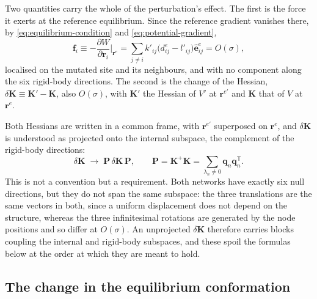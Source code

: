 \documentclass[11pt]{article}
\newcommand{\rr}{\mathbf{r}}
\newcommand{\ee}{\hat{\mathbf{e}}}
\newcommand{\KK}{\mathbf{K}}
\newcommand{\re}{\rr^{e}}
\newcommand{\rem}{\rr^{e\prime}}   %
\newcommand{\eeije}{\ee^{e}_{ij}}
\newcommand{\dije}{d^{e}_{ij}}
\newcommand{\lijm}{l'_{ij}}
\newcommand{\kijm}{k'_{ij}}
\begin{document}
Two quantities carry the whole of the perturbation's effect.
The first is the force it exerts at the reference equilibrium.
Since the reference gradient vanishes there, by \eqref{eq:equilibrium-condition} and \eqref{eq:potential-gradient},
\begin{equation}
\mathbf{f}_i \equiv -\frac{\partial W}{\partial \rr_i}\bigg|_{\re}
= \sum_{j \ne i} \kijm \big(\dije - \lijm\big) \eeije
= O(\sigma),
\label{eq:mutational-force}
\end{equation}
localised on the mutated site and its neighbours, and with no component along the six rigid-body directions.
The second is the change of the Hessian, $\delta\KK \equiv \KK' - \KK$, also $O(\sigma)$, with $\KK'$ the Hessian of $V'$ at $\rem$ and $\KK$ that of $V$ at $\re$.

Both Hessians are written in a common frame, with $\rem$ superposed on $\re$, and $\delta\KK$ is understood as projected onto the internal subspace, the complement of the rigid-body directions:
\begin{equation}
\delta\KK \;\to\; \mathbf{P}\,\delta\KK\,\mathbf{P},
\qquad
\mathbf{P} = \KK^{+}\KK = \sum_{\lambda_n \ne 0} \mathbf{q}_n\mathbf{q}_n^{\mathsf T}.
\label{eq:internal-projection}
\end{equation}
This is not a convention but a requirement.
Both networks have exactly six null directions, but they do not span the same subspace: the three translations are the same vectors in both, since a uniform displacement does not depend on the structure, whereas the three infinitesimal rotations are generated by the node positions and so differ at $O(\sigma)$.
An unprojected $\delta\KK$ therefore carries blocks coupling the internal and rigid-body subspaces, and these spoil the formulas below at the order at which they are meant to hold.

\subsection*{The change in the equilibrium conformation}
\end{document}
